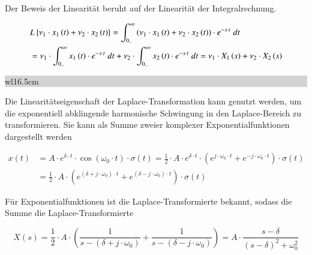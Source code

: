 \noindent Der Beweis der Linearität beruht auf der Linearität der Integralrechnung.

\begin{equation}\label{eq:fourthirtyone}
\begin{split}
& L\left\{\nu _{1} \cdot x_{1} \left(t\right)+\nu _{2} \cdot x_{2} \left(t\right)\right\}=\int _{0_{-} }^{\infty }\left(\nu _{1} \cdot x_{1} \left(t\right)+\nu _{2} \cdot x_{2} \left(t\right)\right)\cdot e^{-s\cdot t} {\rm \; } dt \\ 
& =\nu _{1} \cdot \int _{0_{-} }^{\infty }x_{1} \left(t\right)\cdot e^{-s\cdot t} {\rm \; } dt+\nu _{2} \cdot \int _{0_{-} }^{\infty }x_{2} \left(t\right)\cdot e^{-s\cdot t} {\rm \; } dt=\nu _{1} \cdot X_{1} \left(s\right)+\nu _{2} \cdot X_{2} \left(s\right)
\end{split}
\end{equation}\bigskip

\noindent
\colorbox{lightgray}{%
%
\renewcommand\arraystretch{0.6}%
\begin{tabular}{ wl{16.5cm} }
{\selectfont{Beispiel: Linearität der Laplace-Transformation} }
\end{tabular}%
}\bigskip

\noindent Die Linearitätseigenschaft der Laplace-Transformation kann genutzt werden, um die exponentiell abklingende harmonische Schwingung in den Laplace-Bereich zu transformieren. Sie kann als Summe zweier komplexer Exponentialfunktionen dargestellt werden

\begin{equation}\label{eq:fourthirtytwo}
\begin{split}
x\left(t\right) & = A\cdot e^{\delta \cdot t} \cdot \cos \left(\omega _{0} \cdot t\right)\cdot \sigma \left(t\right)=\frac{1}{2} \cdot A\cdot e^{\delta \cdot t} \cdot \left(e^{j\cdot \omega _{0} \cdot t} +e^{-j\cdot \omega _{0} \cdot t} \right)\cdot \sigma \left(t\right) \\ 
& = {\frac{1}{2} \cdot A\cdot \left(e^{\left(\delta +j\cdot \omega _{0} \right)\cdot t} +e^{\left(\delta -j\cdot \omega _{0} \right)\cdot t} \right)\cdot \sigma \left(t\right)} 
\end{split}
\end{equation}

\noindent Für Exponentialfunktionen ist die Laplace-Transformierte bekannt, sodass die Summe die Laplace-Transformierte

\begin{equation}\label{eq:fourthirtythree}
X\left(s\right)=\frac{1}{2} \cdot A\cdot \left(\frac{1}{s-\left(\delta +j\cdot \omega _{0} \right)} +\frac{1}{s-\left(\delta -j\cdot \omega _{0} \right)} \right)=A\cdot \frac{s-\delta }{\left(s-\delta \right)^{2} +\omega _{0}^{2} } 
\end{equation}

